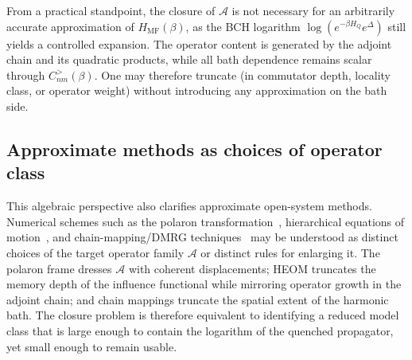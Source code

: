 From a practical standpoint, the closure of $\mathcal A$ is not necessary for an arbitrarily accurate approximation of $H_{\mathrm{MF}}(\beta)$, as the BCH logarithm $\log(e^{-\beta H_Q}e^\Delta)$ still yields a controlled expansion. The operator content is generated by the adjoint chain and its quadratic products, while all bath dependence remains scalar through $C^{>}_{nm}(\beta)$. One may therefore truncate (in commutator depth, locality
class, or operator weight) without introducing any approximation on the bath side.

\subsection*{Approximate methods as choices of operator class}

This algebraic perspective also clarifies approximate open-system methods.
Numerical schemes such as the polaron transformation~\cite{weissQuantumDissipativeSystems2012,nazirReactionCoordinateMapping2018},
hierarchical equations of motion~\cite{tanimuraReducedHierarchicalEquations2014},
and chain-mapping/DMRG techniques~\cite{XuVadimovStockburgerAnkerhold2026}
may be understood as distinct choices of the target operator family
$\mathcal{A}$ or distinct rules for enlarging it. The polaron frame dresses
$\mathcal{A}$ with coherent displacements; HEOM truncates the memory depth of
the influence functional while mirroring operator growth in the adjoint chain;
and chain mappings truncate the spatial extent of the harmonic bath. The
closure problem is therefore equivalent to identifying a reduced model class
that is large enough to contain the logarithm of the quenched propagator, yet
small enough to remain usable.


